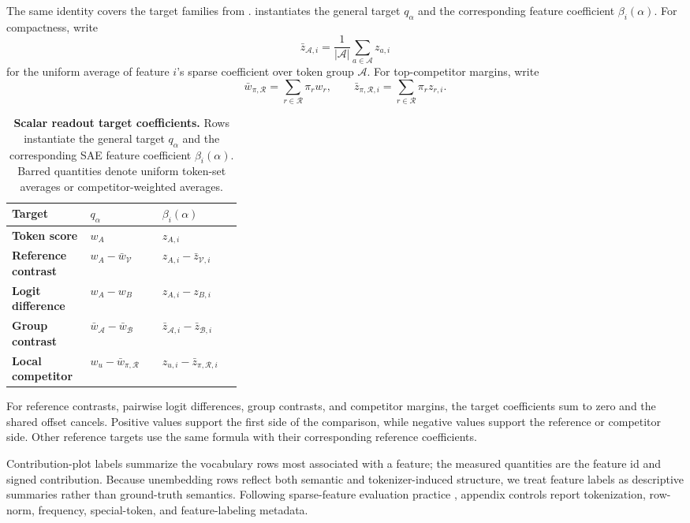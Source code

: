 The same identity covers the target families from .
 instantiates the general target \(q_\alpha\) and
the corresponding feature coefficient \(\beta_i(\alpha)\). For compactness,
write
\[
    \bar{z}_{\mathcal{A},i}
    =
    \frac{1}{|\mathcal{A}|}
    \sum_{a\in\mathcal{A}}z_{a,i}
\]
for the uniform average of feature \(i\)'s sparse coefficient over token group
\(\mathcal{A}\). For top-competitor margins, write
\[
    \bar{w}_{\pi,\mathcal{R}}
    =
    \sum_{r\in\mathcal{R}}\pi_r w_r,
    \qquad
    \bar{z}_{\pi,\mathcal{R},i}
    =
    \sum_{r\in\mathcal{R}}\pi_r z_{r,i}.
\]

\begin{table}[tbp]
\caption{\textbf{Scalar readout target coefficients.}
Rows instantiate the general target \(q_\alpha\) and the corresponding SAE
feature coefficient \(\beta_i(\alpha)\). Barred quantities denote uniform
token-set averages or competitor-weighted averages.}
\label{tab:method-special-cases}
\centering
\footnotesize
\setlength{\tabcolsep}{3pt}
\renewcommand{\arraystretch}{1.14}
\begin{tabularx}{\linewidth}{@{}>{\RaggedRight\arraybackslash}p{0.34\linewidth}Z Z@{}}
\toprule
Target & \(q_\alpha\) & \(\beta_i(\alpha)\) \\
\midrule
\textbf{Token score} & \(w_A\) & \(z_{A,i}\) \\
\addlinespace[1pt]
\textbf{Reference contrast} & \(w_A-\bar{w}_{\mathcal{V}}\) &
\(z_{A,i}-\bar{z}_{\mathcal{V},i}\) \\
\addlinespace[1pt]
\textbf{Logit difference} & \(w_A-w_B\) & \(z_{A,i}-z_{B,i}\) \\
\addlinespace[1pt]
\textbf{Group contrast} &
\(\bar{w}_{\mathcal{A}}-\bar{w}_{\mathcal{B}}\) &
\(\bar{z}_{\mathcal{A},i}-\bar{z}_{\mathcal{B},i}\) \\
\addlinespace[1pt]
\textbf{Local competitor} &
\(w_u-\bar{w}_{\pi,\mathcal{R}}\) &
\(z_{u,i}-\bar{z}_{\pi,\mathcal{R},i}\) \\
\bottomrule
\end{tabularx}
\end{table}

For reference contrasts, pairwise logit differences, group contrasts, and
competitor margins, the target coefficients sum to zero and the shared offset
cancels. Positive values support the first side of the comparison, while
negative values support the reference or competitor side. Other reference
targets use the same formula with their corresponding reference coefficients.

Contribution-plot labels summarize the vocabulary rows most associated with a
feature; the measured quantities are the feature id and signed contribution.
Because unembedding rows reflect both semantic and tokenizer-induced structure,
we treat feature labels as descriptive summaries rather than ground-truth
semantics. Following sparse-feature evaluation practice
\citep{karvonen2025saebench,makelov2024principled}, appendix controls report
tokenization, row-norm, frequency, special-token, and feature-labeling metadata.